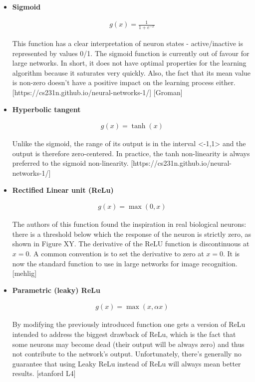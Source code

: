 \begin{itemize}

\item \textbf{Sigmoid}

\begin{gather}
	g(x)=\frac{1}{1 + e^{-x}}
\end{gather}

This function has a clear interpretation of neuron states - active/inactive is represented by values 0/1. The sigmoid function is currently out of favour for large networks. In short, it does not have optimal properties for the learning algorithm because it saturates very quickly. Also, the fact that its mean value is non-zero doesn't have a positive impact on the learning process either. [https://cs231n.github.io/neural-networks-1/] [Groman]

\item \textbf{Hyperbolic tangent}

\begin{gather}
	g(x)=\tanh (x)
\end{gather}

Unlike the sigmoid, the range of its output is in the interval <-1,1> and the output is therefore zero-centered. In practice, the tanh non-linearity is always preferred to the sigmoid non-linearity. [https://cs231n.github.io/neural-networks-1/]

\item \textbf{Rectified Linear unit (ReLu)}

\begin{gather}
	g(x)=\max (0,x)
\end{gather}

The authors of this function found the inspiration in real biological neurons: there is a threshold below which the response of the neuron is strictly zero, as shown in Figure XY. The derivative of the ReLU function is discontinuous at $ x=0 $. A common convention is to set the derivative to zero at $ x=0 $. It is now the standard function to use in large networks for image recognition. [mehlig]

\item \textbf{Parametric (leaky) ReLu}

\begin{gather}
	g(x)=\max(x,\alpha x)
\end{gather}

By modifying the previously introduced function one gets a version of ReLu intended to address the biggest drawback of ReLu, which is the fact that some neurons may become dead (their output will be always zero) and thus not contribute to the network's output. Unfortunately, there's generally no guarantee that using Leaky ReLu instead of ReLu will always mean better results. [stanford L4]


\end{itemize}
